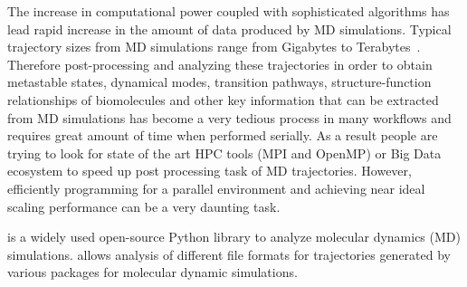 \label{sec:introduction}
The increase in computational power coupled with sophisticated algorithms has lead rapid increase in the amount of data produced by MD simulations. 
Typical trajectory sizes from MD simulations range from Gigabytes to Terabytes~\cite{Cheatham:2015}. 
Therefore post-processing and analyzing these trajectories in order to obtain metastable states, dynamical modes, transition pathways, structure-function relationships of biomolecules and other key information that can be extracted from MD simulations has become a very tedious process in many workflows and requires great amount of time when performed serially. 
As a result people are trying to look for state of the art HPC tools (MPI and OpenMP) or Big Data ecosystem to speed up post processing task of MD trajectories.
 
However, efficiently programming for a parallel environment and achieving near ideal scaling performance can be a very daunting task. 

 \citep{Gowers:2016aa,Michaud-Agrawal:2011fu} is a widely used open-source Python library to analyze molecular dynamics (MD) simulations. 
 allows analysis of different file formats for trajectories generated by various packages for molecular dynamic simulations. 

